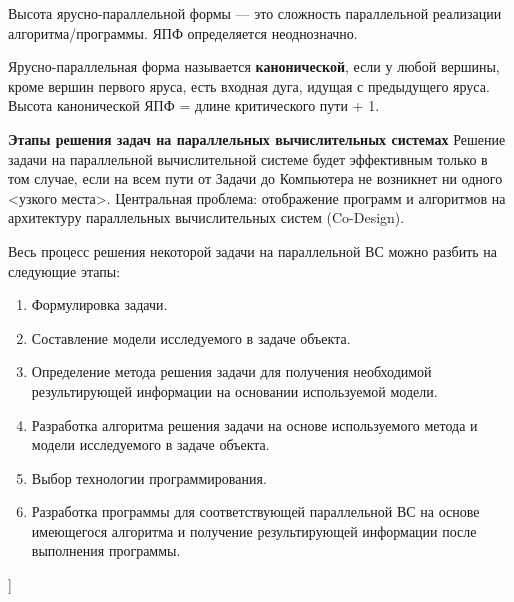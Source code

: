 Высота ярусно-параллельной формы --- это сложность параллельной реализации алгоритма/программы.
ЯПФ определяется неоднозначно.

Ярусно-параллельная форма называется \textbf{канонической}, если у любой вершины, кроме вершин первого яруса, есть входная дуга, идущая с предыдущего яруса.
Высота канонической ЯПФ = длине критического пути + 1.

\textbf{Этапы решения задач на параллельных вычислительных системах}
Решение задачи на параллельной вычислительной системе будет эффективным только в том случае, если на всем пути от Задачи до Компьютера не возникнет ни одного <узкого места>.
Центральная проблема: отображение программ и алгоритмов на архитектуру параллельных вычислительных систем (Co-Design).

Весь процесс решения некоторой задачи на параллельной  ВС можно разбить на следующие этапы:
\begin{enumerate}
    \item Формулировка задачи.
    \item Составление модели исследуемого в задаче объекта.
    \item Определение метода решения задачи для получения необходимой результирующей информации на основании используемой модели.
    \item Разработка алгоритма решения задачи на основе используемого метода и модели исследуемого в задаче объекта.
    \item Выбор технологии программирования.
    \item Разработка программы для соответствующей параллельной ВС на основе имеющегося алгоритма и получение результирующей информации после выполнения программы.
\end{enumerate}


\bigbreak
[\cite[page 69-96]{replace_me}]
